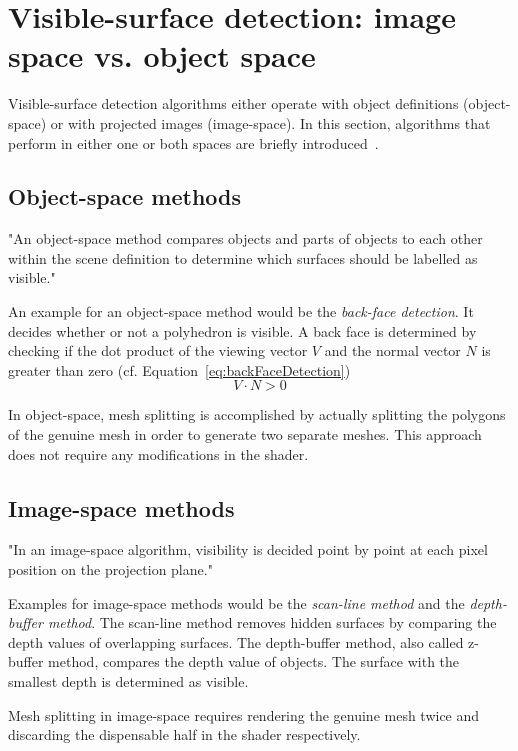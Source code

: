 \section{Visible-surface detection: image space vs. object space}
Visible-surface detection algorithms either operate with object definitions (object-space) or with projected images (image-space). In this section, algorithms that perform in either one or both spaces are briefly introduced~\cite{book:computerGraphicsHearn}.

\subsection{Object-space methods}
"An object-space method compares objects and parts of objects to each other within the scene definition to determine which surfaces should be labelled as visible."~\cite{book:computerGraphicsHearn}

An example for an object-space method would be the \emph{back-face detection}. It decides whether or not a polyhedron is visible. A back face is determined by checking if the dot product of the viewing vector $V$ and the normal vector $N$ is greater than zero (cf. Equation~\ref{eq:backFaceDetection})
\begin{equation}
V \cdot N > 0
\label{eq:backFaceDetection}
\end{equation}

In object-space, mesh splitting is accomplished by actually splitting the polygons of the genuine mesh in order to generate two separate meshes. This approach does not require any modifications in the shader.

\subsection{Image-space methods}
"In an image-space algorithm, visibility is decided point by point at each pixel position on the projection plane."~\cite{book:computerGraphicsHearn}

Examples for image-space methods would be the \emph{scan-line method} and the \emph{depth-buffer method}. The scan-line method removes hidden surfaces by comparing the depth values of overlapping surfaces. The depth-buffer method, also called z-buffer method, compares the depth value of objects. The surface with the smallest depth is determined as visible.

Mesh splitting in image-space requires rendering the genuine mesh twice and discarding the dispensable half in the shader respectively.


